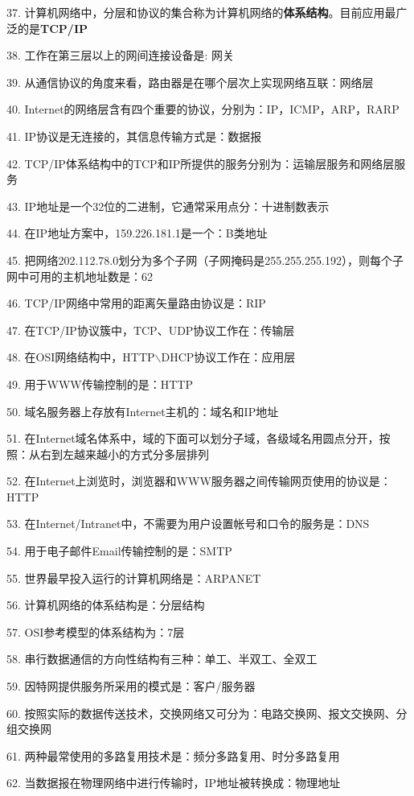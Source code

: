 \documentclass[fleqn]{article}
\begin{document}
37. 计算机网络中，分层和协议的集合称为计算机网络的{\bfseries 体系结构}。目前应用最广泛的是\textbf{TCP/IP}

38. 工作在第三层以上的网间连接设备是: 网关

39. 从通信协议的角度来看，路由器是在哪个层次上实现网络互联：网络层

40. Internet的网络层含有四个重要的协议，分别为：IP，ICMP，ARP，RARP 

41. IP协议是无连接的，其信息传输方式是：数据报

42. TCP/IP体系结构中的TCP和IP所提供的服务分别为：运输层服务和网络层服务

43. IP地址是一个32位的二进制，它通常采用点分：十进制数表示

44. 在IP地址方案中，159.226.181.1是一个：B类地址

45. 把网络202.112.78.0划分为多个子网（子网掩码是255.255.255.192），则每个子网中可用的主机地址数是：62

46. TCP/IP网络中常用的距离矢量路由协议是：RIP

47. 在TCP/IP协议簇中，TCP、UDP协议工作在：传输层

48. 在OSI网络结构中，HTTP$\backslash$DHCP协议工作在：应用层

49. 用于WWW传输控制的是：HTTP

50. 域名服务器上存放有Internet主机的：域名和IP地址

51. 在Internet域名体系中，域的下面可以划分子域，各级域名用圆点分开，按照：从右到左越来越小的方式分多层排列

52. 在Internet上浏览时，浏览器和WWW服务器之间传输网页使用的协议是：HTTP

53. 在Internet/Intranet中，不需要为用户设置帐号和口令的服务是：DNS

54. 用于电子邮件Email传输控制的是：SMTP

55. 世界最早投入运行的计算机网络是：ARPANET

56. 计算机网络的体系结构是：分层结构

57. OSI参考模型的体系结构为：7层

58. 串行数据通信的方向性结构有三种：单工、半双工、全双工

59. 因特网提供服务所采用的模式是：客户/服务器

60. 按照实际的数据传送技术，交换网络又可分为：电路交换网、报文交换网、分组交换网

61. 两种最常使用的多路复用技术是：频分多路复用、时分多路复用

62. 当数据报在物理网络中进行传输时，IP地址被转换成：物理地址
\end{document}
